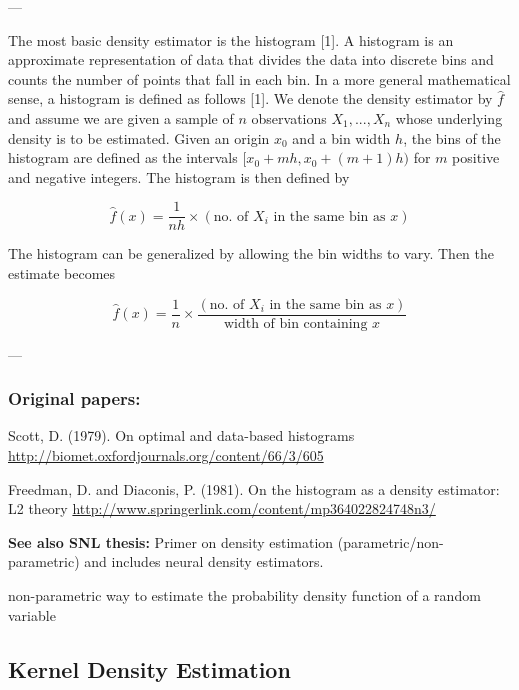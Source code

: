 ---

The most basic density estimator is the histogram [1]. A histogram is an approximate representation of data that divides the data into discrete bins and counts the number of points that fall in each bin. In a more general mathematical sense, a histogram is defined as follows [1]. We denote the density estimator by $\hat{f}$ and assume we are given a sample of $n$ observations $X_1, ..., X_n$ whose underlying density is to be estimated. Given an origin $x_0$ and a bin width $h$, the bins of the histogram are defined as the intervals $[x_0 + mh, x_0 + (m+1)h)$ for $m$ positive and negative integers. The histogram is then defined by

\begin{equation*}
    \hat{f}(x) = \frac{1}{nh} \times (\text{no. of } X_i \text{ in the same bin as } x)
\end{equation*}

The histogram can be generalized by allowing the bin widths to vary. Then the estimate becomes 

\begin{equation*}
    \hat{f}(x) = \frac{1}{n} \times \frac{(\text{no. of } X_i \text{ in the same bin as } x)}{\text{width of bin containing }x}
\end{equation*}


---


\subsubsection*{Original papers:} 

Scott, D. (1979). On optimal and data-based histograms \url{http://biomet.oxfordjournals.org/content/66/3/605}

Freedman, D. and Diaconis, P. (1981). On the histogram as a density estimator: L2 theory \url{http://www.springerlink.com/content/mp364022824748n3/}

\textbf{See also SNL thesis:} Primer on density estimation (parametric/non-parametric) and includes neural density estimators. 


non-parametric way to estimate the probability density function of a random variable

\subsection{Kernel Density Estimation}

